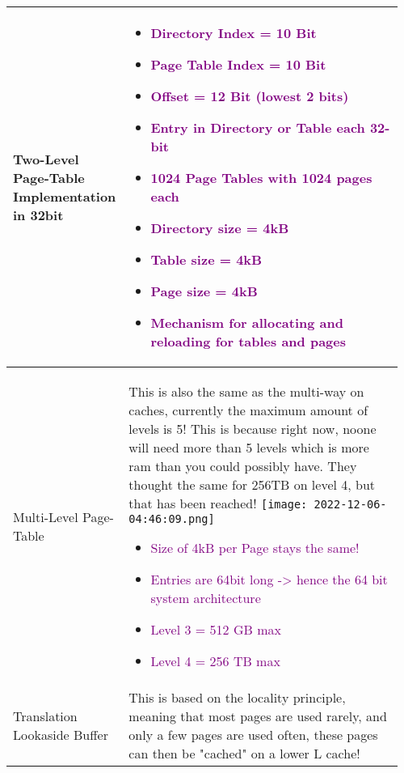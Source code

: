 \documentclass[main.tex,fontsize=8pt,paper=a4,paper=portrait,DIV=calc,]{scrartcl}
\begin{document}
\pagebreak 
\begin{table}[ht!]
\begin{tabular}{|m{0.2\linewidth}|m{0.755\linewidth}|}
\hline
Two-Level Page-Table Implementation in 32bit &
\vspace{2mm}
\begin{itemize}
\item \textcolor{purple}{Directory Index = 10 Bit}
\item \textcolor{purple}{Page Table Index = 10 Bit}
\item \textcolor{purple}{Offset = 12 Bit (lowest 2 bits)}
\item \textcolor{purple}{Entry in Directory or Table each 32-bit}
\item \textcolor{purple}{1024 Page Tables with 1024 pages each}
\item \textcolor{purple}{Directory size = 4kB}
\item \textcolor{purple}{Table size = 4kB}
\item \textcolor{purple}{Page size = 4kB}
\item \textcolor{purple}{Mechanism for allocating and reloading for tables and pages}
\vspace{-3mm}
\end{itemize} 
\\
\hline
Multi-Level Page-Table & 
This is also the same as the multi-way on caches, currently the maximum amount of levels is 5!\newline
This is because right now, noone will need more than 5 levels which is more ram than you could possibly have.\newline
They thought the same for 256TB on level 4, but that has been reached!\newline
\texttt{[image: 2022-12-06-04:46:09.png]} 
\begin{itemize}
\item \textcolor{purple}{Size of 4kB per Page stays the same!} 
\item \textcolor{purple}{Entries are 64bit long -> hence the 64 bit system architecture}
\item \textcolor{purple}{Level 3 = 512 GB max}
\item \textcolor{purple}{Level 4 = 256 TB max}
\vspace{-3mm}
\end{itemize}\\ 
\hline
Translation Lookaside Buffer & 
This is based on the locality principle, meaning that most pages are used rarely, and only a few pages are used often, these pages can then be "cached" on a lower L cache!\newline

\end{tabular}
\end{table}
\end{document}
